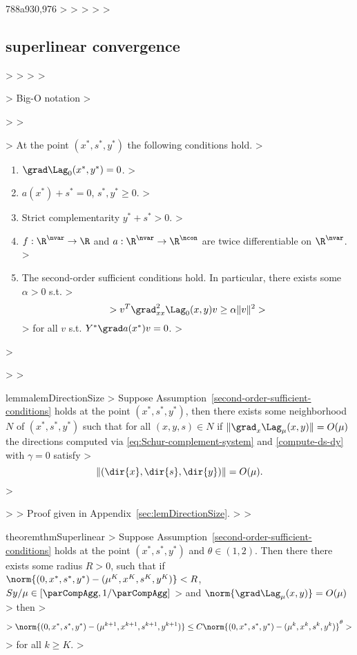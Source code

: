788a930,976
> %
> 
> \if{}
> 
> \subsection{superlinear convergence}
> 
> 
> 
> \begin{definition}
> Big-O notation
> \end{definition}
> 
> \begin{assumption}\label{second-order-sufficient-conditions}
> At the point $(x^{*},s^{*},y^{*})$ the following conditions hold.
> \begin{enumerate}
> \item $\grad \Lag_{0}(x^{*}, y^{*}) = 0$.
> \item $a(x^{*}) + s^{*} = 0$, $s^{*}, y^{*} \ge 0$.
> \item Strict complementarity $y^{*} + s^{*} > 0$.
> \item $f : \R^{\nvar} \rightarrow \R$ and $a : \R^{\nvar} \rightarrow \R^{\ncon}$ are twice differentiable on $\R^{\nvar}$.
> \item The second-order sufficient conditions hold. In particular, there exists some $\alpha > 0$ s.t.
> $$
> v^T \grad^2_{xx} \Lag_{0}(x,y) v \ge \alpha \| v \|^2
> $$
> for all $v$ s.t. $Y^{*} \grad a(x^{*}) v = 0$.
> \end{enumerate}
> \end{assumption}
> 
> \begin{restatable}{lemma}{lemDirectionSize}\label{lemDirectionSize}
> Suppose Assumption~\ref{second-order-sufficient-conditions} holds at the point $(x^{*}, s^{*}, y^{*})$, then there exists some neighborhood $N$ of $(x^{*},s^{*},y^{*})$ such that for all $(x,y,s) \in N$ if $\| \grad_{x} \Lag_{\mu}(x,y) \|  = O(\mu)$ the directions computed via \eqref{eq:Schur-complement-system} and \eqref{compute-ds-dy} with  $\gamma = 0$ satisfy 
> $$\| (\dir{x}, \dir{s}, \dir{y}) \| =  O( \mu  ).$$
> \end{restatable}
> 
> Proof given in Appendix~\ref{sec:lemDirectionSize}.
> 
> \begin{restatable}{theorem}{thmSuperlinear}\label{thmSuperlinear}
> Suppose Assumption~\ref{second-order-sufficient-conditions} holds at the point $(x^{*}, s^{*}, y^{*})$ and $\theta \in (1,2)$. Then there there exists some radius $R > 0$, such that if  $\norm{ (0,x^{*},s^{*},y^{*}) - (\mu^K,x^K,s^K,y^K) } < R$, $Sy / \mu \in [\parCompAgg, 1/\parCompAgg]$
> and $\norm{ \grad \Lag_{\mu}(x,y) } = O(\mu)$ 
> then
> $$
> \norm{(0,x^{*},s^{*},y^{*}) - (\mu^{k+1},x^{k+1},s^{k+1},y^{k+1})} \le C \norm{ (0,x^{*},s^{*},y^{*}) - (\mu^{k},x^{k},s^{k},y^{k}) }^{\theta}
> $$
> for all $k \ge K$.
> \end{restatable}
